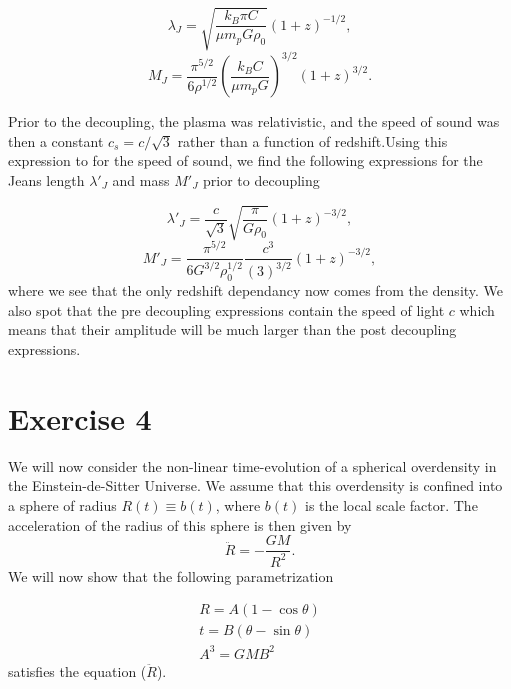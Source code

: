 \documentclass[a4paper]{article}
\begin{document}
\begin{equation}
    \lambda_J = \sqrt{\frac{k_B \pi C }{\mu m_p G \rho_0}} (1+z)^{-1/2},
\end{equation}
\begin{equation}
    M_J =  \frac{\pi^{5/2}}{6 \rho^{1/2}}\left( \frac{k_B C}{\mu m_p G} \right)^{3/2} (1+z)^{3/2}.
\end{equation}
    
Prior to the decoupling, the plasma was relativistic, and the speed of sound was then a constant $c_s = c/ \sqrt{3}$ rather than a function of redshift.Using this expression to for the speed of sound, we find the following expressions for the Jeans length $\lambda'_J$ and mass $M'_J$ prior to decoupling

\begin{equation}
    \lambda'_J = \frac{c}{\sqrt{3}} \sqrt{\frac{\pi}{G\rho_0}}(1+z)^{-3/2},
\end{equation}
\begin{equation}
    M'_J = \frac{\pi^{5/2}}{6 G^{3/2}\rho_0^{1/2}} \frac{c^3}{(3)^{3/2}}(1+z)^{-3/2},
\end{equation}
where we see that the only redshift dependancy now comes from the density. We also spot that the pre decoupling expressions contain the speed of light $c$ which means that their amplitude will be much larger than the post decoupling expressions.

\section*{Exercise 4}

We will now consider the non-linear time-evolution of a spherical overdensity in the Einstein-de-Sitter Universe. We assume that this overdensity is confined into a sphere of radius $R(t) \equiv b(t)$, where $b(t)$ is the local scale factor. The acceleration of the radius of this sphere is then given by
\begin{equation}
    \ddot{R} = - \frac{GM}{R^2}.
\end{equation}
We will now show that the following parametrization 

\begin{align}
    R = A(1 - \cos \theta)\\
    t = B(\theta - \sin \theta)\\
    A^3 = GMB^2
\end{align}
satisfies the equation ($\ddot{R}$).
\end{document}
